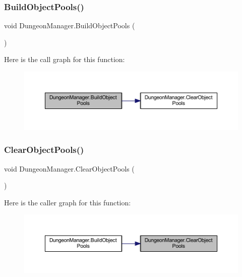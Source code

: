\mbox{\label{class_dungeon_manager_a5a401d26555b3eff094668620d4857ca}} 
\subsubsection{\texorpdfstring{BuildObjectPools()}{BuildObjectPools()}}
{\footnotesize\ttfamily void Dungeon\+Manager.\+Build\+Object\+Pools (\begin{DoxyParamCaption}{ }\end{DoxyParamCaption})}

Here is the call graph for this function\+:
\nopagebreak
\begin{figure}[H]
\begin{center}
\leavevmode
\includegraphics[width=350pt]{class_dungeon_manager_a5a401d26555b3eff094668620d4857ca_cgraph}
\end{center}
\end{figure}
\mbox{\label{class_dungeon_manager_a693d00ae1ca65d58dab634deaa9cfec9}} 
\subsubsection{\texorpdfstring{ClearObjectPools()}{ClearObjectPools()}}
{\footnotesize\ttfamily void Dungeon\+Manager.\+Clear\+Object\+Pools (\begin{DoxyParamCaption}{ }\end{DoxyParamCaption})}

Here is the caller graph for this function\+:
\nopagebreak
\begin{figure}[H]
\begin{center}
\leavevmode
\includegraphics[width=350pt]{class_dungeon_manager_a693d00ae1ca65d58dab634deaa9cfec9_icgraph}
\end{center}
\end{figure}
\mbox{\label{class_dungeon_manager_ab7edf3b19e13892178a34ece10f4c5d5}} 
